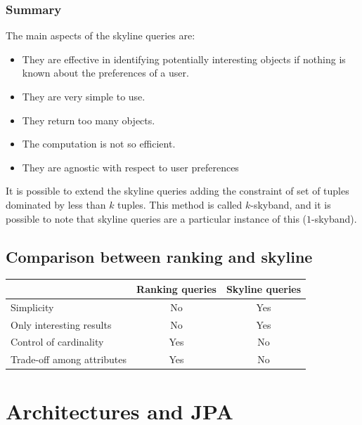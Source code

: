 \documentclass[12pt, a4paper]{report}
\newtheorem[style=M,bodystyle=\normalfont]{theorem}{Theorem}
\newtheorem[style=M,bodystyle=\normalfont]{corollary}{Corollary}
\newtheorem[style=M,bodystyle=\normalfont]{lemma}{Lemma}
\newtheorem[style=M,bodystyle=\normalfont]{definition}{Definition}
\begin{document}
    \subsection{Summary}
    The main aspects of the skyline queries are: 
    \begin{itemize}
        \item They are effective in identifying potentially interesting objects if nothing is known about the preferences of a user. 
        \item They are very simple to use. 
        \item They return too many objects. 
        \item The computation is not so efficient. 
        \item They are agnostic with respect to user preferences
    \end{itemize}
    It is possible to extend the skyline queries adding the constraint of set of tuples dominated by less than $k$ tuples. This method is called $k$-skyband, and it is 
    possible to note that skyline queries are a particular instance of this ($1$-skyband). 

    \section{Comparison between ranking and skyline}
    \begin{table}[H]
        \centering
        \begin{tabular}{l|cc|}
        \cline{2-3}
                                                         & \textbf{Ranking queries} & \textbf{Skyline queries} \\ \hline
        \multicolumn{1}{|l|}{Simplicity}                 & No              & Yes             \\
        \multicolumn{1}{|l|}{Only interesting results}   & No              & Yes             \\
        \multicolumn{1}{|l|}{Control of cardinality}     & Yes             & No              \\
        \multicolumn{1}{|l|}{Trade-off among attributes} & Yes             & No              \\ \hline
        \end{tabular}
    \end{table}

\newpage 

\chapter{Architectures and JPA}
\end{document}
